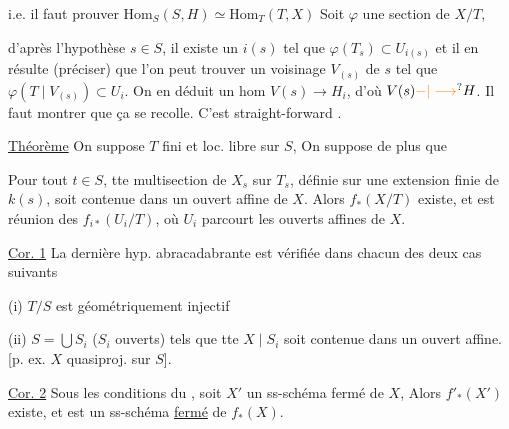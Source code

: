 
i.e. il faut prouver $\mathrm{Hom}_S(S,H)\simeq\mathrm{Hom}_T(T,X)$ Soit $\varphi$ une section de $X/T$,


d'après l'hypothèse   $s\in S$, il existe un $i(s)$ tel que $\varphi(T_s)\subset U_{i(s)}$ et il en résulte (préciser) que l'on peut trouver un voisinage  $V_{(s)}$ de $s$ tel que $\varphi(T\mid V_{(s)})\subset U_i$. On en déduit un hom $V(s)\longrightarrow H_i$, d'où $V(s)\unsure{-|\longrightarrow} H$. Il faut montrer que ça se recolle. C'est straight-forward \unsure{\ldots}.

\uline{Théorème} On suppose $T$ fini et loc. libre sur $S$,  On suppose de plus que 


Pour tout $t\in S$, tte multisection de $X_s$ sur $T_s$, définie sur une extension finie de $k(s)$, soit contenue dans un ouvert affine de $X$. Alors  \deleted{[condition tjrs remplie si tte partie} $f_*(X/T)$ existe, et est réunion des $f_{i*}(U_i/T)$, où $U_i$ parcourt les ouverts affines de $X$.


\uline{Cor. 1} La dernière hyp. abracadabrante est vérifiée dans chacun des deux cas suivants

(i) $T/S$ est géométriquement injectif

(ii) $S=\bigcup S_i$ ($S_i$ ouverts) tels que tte  $X\mid S_i$ soit contenue dans un ouvert affine. [p. ex. $X$ quasiproj. sur $S$].

\uline{Cor. 2} Sous les conditions du , soit $X'$ un ss-schéma fermé de $X$,  Alors $f'_*(X')$ existe, et est un ss-schéma \uline{fermé} de $f_*(X)$.

